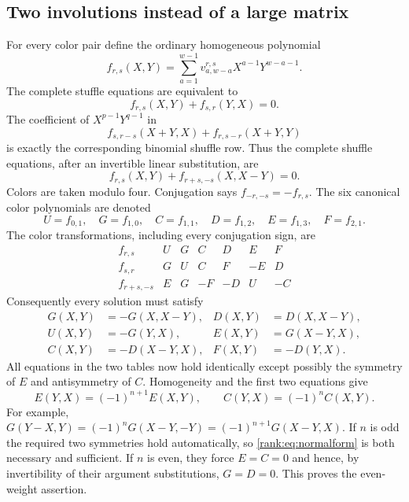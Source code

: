 \documentclass[11pt]{article}
\numberwithin{equation}{section}
\theoremstyle{plain}
\theoremstyle{definition}
\theoremstyle{remark}
\begin{document}
\subsection{Two involutions instead of a large matrix}
For every color pair define the ordinary homogeneous polynomial
\[
 f_{r,s}(X,Y)=\sum_{a=1}^{w-1}v^{r,s}_{a,w-a}X^{a-1}Y^{w-a-1}.
\]
The complete stuffle equations are equivalent to
\begin{equation}\label{rank:eq:stuffle}
 f_{r,s}(X,Y)+f_{s,r}(Y,X)=0.
\end{equation}
The coefficient of $X^{p-1}Y^{q-1}$ in
\[
 f_{s,r-s}(X+Y,X)+f_{r,s-r}(X+Y,Y)
\]
is exactly the corresponding binomial shuffle row. Thus the complete
shuffle equations, after an invertible linear substitution, are
\begin{equation}\label{rank:eq:shuffle}
 f_{r,s}(X,Y)+f_{r+s,-s}(X,X-Y)=0.
\end{equation}
Colors are taken modulo four. Conjugation says $f_{-r,-s}=-f_{r,s}$.
The six canonical color polynomials are denoted
\[
 U=f_{0,1},\quad G=f_{1,0},\quad C=f_{1,1},\quad
 D=f_{1,2},\quad E=f_{1,3},\quad F=f_{2,1}.
\]
The color transformations, including every conjugation sign, are
\[
\begin{array}{c|rrrrrr}
 f_{r,s}&U&G&C&D&E&F\\\hline
 f_{s,r}&G&U&C&F&-E&D\\
 f_{r+s,-s}&E&G&-F&-D&U&-C
\end{array}
\]
Consequently every solution must satisfy
\begin{equation}\label{rank:eq:normalform}
\begin{aligned}
 G(X,Y)&=-G(X,X-Y),& D(X,Y)&=D(X,X-Y),\\
 U(X,Y)&=-G(Y,X),& E(X,Y)&=G(X-Y,X),\\
 C(X,Y)&=-D(X-Y,X),& F(X,Y)&=-D(Y,X).
\end{aligned}
\end{equation}
All equations in the two tables now hold identically except possibly
the symmetry of $E$ and antisymmetry of $C$. Homogeneity and the first
two equations give
\[
 E(Y,X)=(-1)^{n+1}E(X,Y),\qquad
 C(Y,X)=(-1)^nC(X,Y).
\]
For example,
$G(Y-X,Y)=(-1)^nG(X-Y,-Y)=(-1)^{n+1}G(X-Y,X)$.
If $n$ is odd the required two symmetries hold automatically, so
\eqref{rank:eq:normalform} is both necessary and sufficient. If $n$ is
even, they force $E=C=0$ and hence, by invertibility of their argument
substitutions, $G=D=0$. This proves the even-weight assertion.
\end{document}
